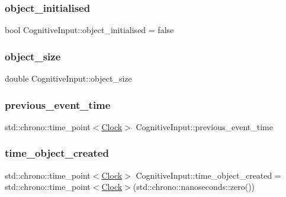 \subsubsection{\texorpdfstring{object\+\_\+initialised}{object\_initialised}}
{\footnotesize\ttfamily bool Cognitive\+Input\+::object\+\_\+initialised = false\hspace{0.3cm}{\ttfamily [private]}}

\mbox{\label{classCognitiveInput_a51a23a86f14e2cb0e60f6df2d8d8494e}} 
\subsubsection{\texorpdfstring{object\+\_\+size}{object\_size}}
{\footnotesize\ttfamily double Cognitive\+Input\+::object\+\_\+size\hspace{0.3cm}{\ttfamily [private]}}

\mbox{\label{classCognitiveInput_a34d8fede9de24f5046f301f5326b3511}} 
\subsubsection{\texorpdfstring{previous\+\_\+event\+\_\+time}{previous\_event\_time}}
{\footnotesize\ttfamily std\+::chrono\+::time\+\_\+point$<$\mbox{\hyperlink{universe_8h_a0ef8d951d1ca5ab3cfaf7ab4c7a6fd80}{Clock}}$>$ Cognitive\+Input\+::previous\+\_\+event\+\_\+time\hspace{0.3cm}{\ttfamily [private]}}

\mbox{\label{classCognitiveInput_a5ad1f0f7523ebfb32d43556b0c94ca70}} 
\subsubsection{\texorpdfstring{time\+\_\+object\+\_\+created}{time\_object\_created}}
{\footnotesize\ttfamily std\+::chrono\+::time\+\_\+point$<$\mbox{\hyperlink{universe_8h_a0ef8d951d1ca5ab3cfaf7ab4c7a6fd80}{Clock}}$>$ Cognitive\+Input\+::time\+\_\+object\+\_\+created = std\+::chrono\+::time\+\_\+point$<$\mbox{\hyperlink{universe_8h_a0ef8d951d1ca5ab3cfaf7ab4c7a6fd80}{Clock}}$>$(std\+::chrono\+::nanoseconds\+::zero())\hspace{0.3cm}{\ttfamily [private]}}



